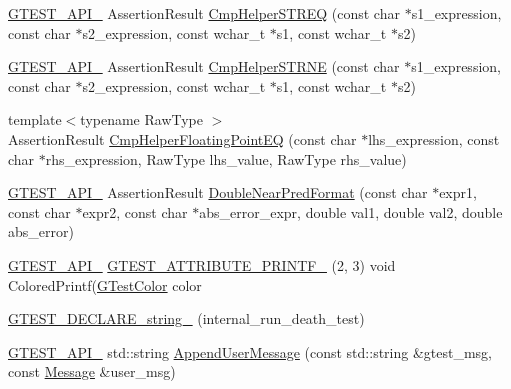 \begin{DoxyCompactItemize}
\item 
\hyperlink{gtest-port_8h_aa73be6f0ba4a7456180a94904ce17790}{G\+T\+E\+S\+T\+\_\+\+A\+P\+I\+\_\+} Assertion\+Result \hyperlink{namespacetesting_1_1internal_ad40d557f9c157790160d6e4f2b0d9bab}{Cmp\+Helper\+S\+T\+R\+EQ} (const char $\ast$s1\+\_\+expression, const char $\ast$s2\+\_\+expression, const wchar\+\_\+t $\ast$s1, const wchar\+\_\+t $\ast$s2)
\item 
\hyperlink{gtest-port_8h_aa73be6f0ba4a7456180a94904ce17790}{G\+T\+E\+S\+T\+\_\+\+A\+P\+I\+\_\+} Assertion\+Result \hyperlink{namespacetesting_1_1internal_a6e700804399b6694d8d6157e3a141b17}{Cmp\+Helper\+S\+T\+R\+NE} (const char $\ast$s1\+\_\+expression, const char $\ast$s2\+\_\+expression, const wchar\+\_\+t $\ast$s1, const wchar\+\_\+t $\ast$s2)
\item 
{\footnotesize template$<$typename Raw\+Type $>$ }\\Assertion\+Result \hyperlink{namespacetesting_1_1internal_a98ce463e5dbe0c6120fa817e1f8f2944}{Cmp\+Helper\+Floating\+Point\+EQ} (const char $\ast$lhs\+\_\+expression, const char $\ast$rhs\+\_\+expression, Raw\+Type lhs\+\_\+value, Raw\+Type rhs\+\_\+value)
\item 
\hyperlink{gtest-port_8h_aa73be6f0ba4a7456180a94904ce17790}{G\+T\+E\+S\+T\+\_\+\+A\+P\+I\+\_\+} Assertion\+Result \hyperlink{namespacetesting_1_1internal_aea60207c4cedc8946a70ada62e38da8f}{Double\+Near\+Pred\+Format} (const char $\ast$expr1, const char $\ast$expr2, const char $\ast$abs\+\_\+error\+\_\+expr, double val1, double val2, double abs\+\_\+error)
\item 
\hyperlink{gtest-port_8h_aa73be6f0ba4a7456180a94904ce17790}{G\+T\+E\+S\+T\+\_\+\+A\+P\+I\+\_\+} \hyperlink{namespacetesting_1_1internal_a5fd9f88035bd7f38979a2b15aead2bab}{G\+T\+E\+S\+T\+\_\+\+A\+T\+T\+R\+I\+B\+U\+T\+E\+\_\+\+P\+R\+I\+N\+T\+F\+\_\+} (2, 3) void Colored\+Printf(\hyperlink{namespacetesting_1_1internal_a648c1bc94c2ef9e868ff3f9dff0f9c4e}{G\+Test\+Color} color
\item 
\hyperlink{namespacetesting_1_1internal_ac20f635c3285878fc1195ce687f23950}{G\+T\+E\+S\+T\+\_\+\+D\+E\+C\+L\+A\+R\+E\+\_\+string\+\_\+} (internal\+\_\+run\+\_\+death\+\_\+test)
\item 
\hyperlink{gtest-port_8h_aa73be6f0ba4a7456180a94904ce17790}{G\+T\+E\+S\+T\+\_\+\+A\+P\+I\+\_\+} std\+::string \hyperlink{namespacetesting_1_1internal_af69e146a989e8d48def39a0cc59461c9}{Append\+User\+Message} (const std\+::string \&gtest\+\_\+msg, const \hyperlink{classtesting_1_1Message}{Message} \&user\+\_\+msg)
\item 

\end{DoxyCompactItemize}
